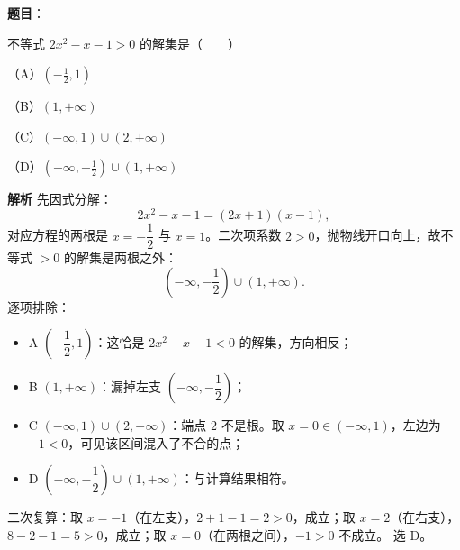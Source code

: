 \begin{answer}

\textbf{题目}：

不等式 $2x^2-x-1>0$ 的解集是\mbox{（　　）}

（A）$\left(-\frac12,1\right)$

（B）$(1,+\infty)$

（C）$(-\infty,1)\cup(2,+\infty)$

（D）$\left(-\infty,-\frac12\right)\cup(1,+\infty)$

\textbf{解析}
先因式分解：
\nopagebreak[4]
\[
2x^2-x-1=(2x+1)(x-1),
\]
对应方程的两根是 $x=-\dfrac12$ 与 $x=1$。二次项系数 $2>0$，抛物线开口向上，故不等式 $>0$ 的解集是两根之外：
\nopagebreak[4]
\[
\left(-\infty,-\frac12\right)\cup(1,+\infty).
\]
逐项排除：
\begin{itemize}
\item A $\left(-\dfrac12,1\right)$：这恰是 $2x^2-x-1<0$ 的解集，方向相反；
\item B $(1,+\infty)$：漏掉左支 $\left(-\infty,-\dfrac12\right)$；
\item C $(-\infty,1)\cup(2,+\infty)$：端点 $2$ 不是根。取 $x=0\in(-\infty,1)$，左边为 $-1<0$，可见该区间混入了不合的点；
\item D $\left(-\infty,-\dfrac12\right)\cup(1,+\infty)$：与计算结果相符。
\end{itemize}
二次复算：取 $x=-1$（在左支），$2+1-1=2>0$，成立；取 $x=2$（在右支），$8-2-1=5>0$，成立；取 $x=0$（在两根之间），$-1>0$ 不成立。
选 D。


\end{answer}
